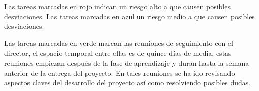 Las tareas marcadas en rojo indican un riesgo alto a que causen posibles desviaciones.
Las tareas marcadas en azul un riesgo medio a que causen posibles desviaciones.

Las tareas marcadas en verde marcan las reuniones de seguimiento con el director, el espacio temporal entre ellas es de quince días de media, estas reuniones empiezan después de la fase de aprendizaje y duran hasta la semana anterior de la entrega del proyecto. En tales reuniones se ha ido revisando aspectos claves del desarrollo del proyecto así como resolviendo posibles dudas.







